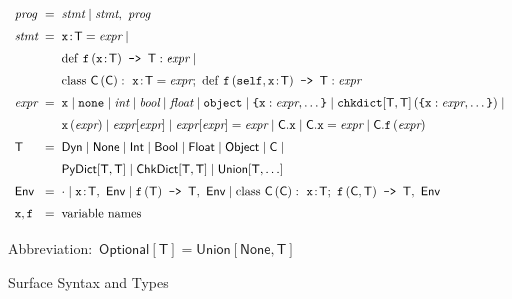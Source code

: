 \documentclass[english,cleveref,submission]{programming}
\makeatletter
\newcommand{\code}[1]{\texttt{#1}}
\newcommand{\defeq}{=}
\newcommand{\langmid}{\mid} %
\newenvironment{langarray}{\(\def\arraystretch{1.5}\begin{array}{l@{\hspace{2mm}}c@{\hspace{2mm}}l}}{\end{array}\)}
\newcommand{\spapp}[2]{#1\,(#2)}
\newcommand{\spann}[2]{#1\!:\!#2}
\newcommand{\typefont}[1]{\mathsf{#1}}
\newcommand{\codefont}[1]{\emph{#1}}
\newcommand{\paramtype}[2]{#1[#2]}
\newcommand{\sptype}{\typefont{T}}
\newcommand{\sptclass}{\typefont{C}}
\newcommand{\sptint}{\typefont{Int}}
\newcommand{\sptbool}{\typefont{Bool}}
\newcommand{\sptfloat}{\typefont{Float}}
\newcommand{\sptdyn}{\typefont{Dyn}}
\newcommand{\sptobject}{\typefont{Object}}
\newcommand{\sptnone}{\typefont{None}}
\newcommand{\sptoptional}[1]{\paramtype{\typefont{Optional}}{#1}}
\newcommand{\sptunion}[1]{\paramtype{\typefont{Union}}{#1}}
\newcommand{\sptrawpydict}{\typefont{PyDict}}
\newcommand{\sptpydict}[2]{\paramtype{\sptrawpydict}{#1, #2}}
\newcommand{\sptchkdict}[2]{\paramtype{\typefont{ChkDict}}{#1, #2}}
\newcommand{\sptenv}{\typefont{Env}}
\newcommand{\sptenvnil}{\cdot}
\newcommand{\sptvardef}[2]{\spann{#1}{#2}}
\newcommand{\sptfundef}[3]{\spapp{#1}{#2}\code{ -> }#3}
\newcommand{\sptclassdef}[4]{\mathrm{class}~\spapp{#1}{#2}:~#3;~#4}
\newcommand{\spx}{\code{x}}
\newcommand{\spf}{\code{f}}
\newcommand{\spc}{\sptclass}
\newcommand{\spprog}{\codefont{prog}}
\newcommand{\spstmt}{\codefont{stmt}}
\newcommand{\spexpr}{\codefont{expr}}
\newcommand{\spvardef}[3]{\sptvardef{#1}{#2} = #3}
\newcommand{\spfundef}[4]{\mathrm{def}~\spapp{#1}{#2}\code{ -> }#3: #4}
\newcommand{\spclassdef}[4]{\mathrm{class}~\spapp{#1}{#2}:~#3;~#4}
\newcommand{\spself}{\code{self}}
\newcommand{\spobject}{\code{object}}
\newcommand{\spnone}{\code{none}}
\newcommand{\spint}{\codefont{int}}
\newcommand{\spbool}{\codefont{bool}}
\newcommand{\spfloat}{\codefont{float}}
\newcommand{\sppydict}[1]{\code{\{}#1\code{\}}}
\newcommand{\spchkdict}[3]{\spapp{\paramtype{\code{chkdict}}{#1, #2}}{#3}}
\newcommand{\spdictref}[2]{#1[#2]}
\newcommand{\spdictset}[3]{\spdictref{#1}{#2} = #3}
\newcommand{\spobjref}[2]{#1.#2}
\newcommand{\spobjset}[3]{\spobjref{#1}{#2} = #3}
\newcommand{\spobjapp}[3]{\spobjref{#1}{\spapp{#2}{#3}}}
\makeatother
\begin{document}
\begin{figure}[t]
  \begin{langarray}
    \spprog & \defeq &
      \spstmt \langmid \spstmt,~\spprog
  \\
    \spstmt & \defeq &
      \spvardef{\spx}{\sptype}{\spexpr} \langmid
  \\ & &
      \spfundef{\spf}{\spann{\spx}{\sptype}}{\sptype}{\spexpr} \langmid
  \\ & &
      \spclassdef{\spc}{\spc}{\spvardef{\spx}{\sptype}{\spexpr}}{\spfundef{\spf}{\spself, \spann{\spx}{\sptype}}{\sptype}{\spexpr}}
  \\
    \spexpr & \defeq &
      \spx \langmid \spnone \langmid \spint \langmid \spbool \langmid \spfloat \langmid \spobject \langmid
      \sppydict{\spx: \spexpr, \ldots} \langmid
      \spchkdict{\sptype}{\sptype}{\sppydict{\spx: \spexpr, \ldots}} \langmid
  \\ & &
      \spapp{\spx}{\spexpr} \langmid
      \spdictref{\spexpr}{\spexpr} \langmid
      \spdictset{\spexpr}{\spexpr}{\spexpr} \langmid
      \spobjref{\spc}{\spx} \langmid
      \spobjset{\spc}{\spx}{\spexpr} \langmid
      \spobjapp{\spc}{\spf}{\spexpr}
  \\
    \sptype & \defeq &
      \sptdyn \langmid
      \sptnone \langmid
      \sptint \langmid
      \sptbool \langmid
      \sptfloat \langmid
      \sptobject \langmid
      \sptclass \langmid
  \\ & &
      \sptpydict{\sptype}{\sptype} \langmid
      \sptchkdict{\sptype}{\sptype} \langmid
      \sptunion{\sptype, \ldots}
  \\
    \sptenv & \defeq &
      \sptenvnil \langmid
      \sptvardef{\spx}{\sptype},~\sptenv \langmid
      \sptfundef{\spf}{\sptype}{\sptype},~\sptenv \langmid
      \sptclassdef{\spc}{\spc}{\sptvardef{\spx}{\sptype}}{\sptfundef{\spf}{\sptclass, \sptype}{\sptype}},~\sptenv
  \\
    \spx, \spf & \defeq & \mbox{variable names}
  \end{langarray}

  \bigskip
  \mbox{Abbreviation: $\sptoptional{\sptype} \defeq \sptunion{\sptnone, \sptype}$}

  \caption{Surface Syntax and Types}
  \label{f:surface-types}
\end{figure}
\end{document}
